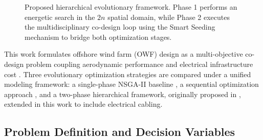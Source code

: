 \documentclass[format=sigconf,anonymous=true,review=true]{acmart}
\begin{document}
\begin{figure}[htbp]
{
  }
  \caption{Proposed hierarchical evolutionary framework. Phase 1 performs an energetic search in the $2n$ spatial domain, while Phase 2 executes the multidisciplinary co-design loop using the Smart Seeding mechanism to bridge both optimization stages.}
  \label{fig:framework_diagram}
\end{figure}

This work formulates offshore wind farm (OWF) design as a multi-objective co-design problem coupling aerodynamic performance and electrical infrastructure cost \cite{Wang2019Integrated, Jin2025Integrated}. Three evolutionary optimization strategies are compared under a unified modeling framework: a single-phase NSGA-II baseline \cite{Deb2002NSGA2}, a sequential optimization approach \cite{Moon2015Optimal, Jin2019PowerLoss}, and a two-phase hierarchical framework, originally proposed in \cite{Silva2025Layout, Silva2025b}, extended in this work to include electrical cabling.

\subsection{Problem Definition and Decision Variables}
\end{document}

